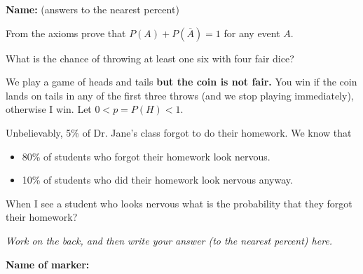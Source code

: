 \documentclass[9pt]{exam}
\begin{document}
\vspace{-4mm}

\textbf{Name:} \dotfill \hspace{3cm} (answers to the nearest percent)

\begin{questions} 
\question[3] From the axioms prove that $P(A) + P(\overline{A}) = 1$ for any event $A$.
\fillwithdottedlines{23mm}

\question[2] What is the chance of throwing at least one six with four fair dice?
\fillwithdottedlines{14mm}

\question We play a game of heads and tails \textbf{but the coin is not fair.} You win if the coin lands on tails in any of the first three throws (and we stop playing immediately), otherwise I win. Let $0 < p = P(H) < 1$.

\question[4] Unbelievably, 5\% of Dr. Jane's class forgot to do their homework. We know that
\begin{itemize}
\item 80\% of students who forgot their homework look nervous.
\item 10\% of students who did their homework look nervous anyway. 
\end{itemize}
When I see a student who looks nervous what is the probability that they forgot their homework?

\vspace{2mm}
\emph{Work on the back, and then write your answer (to the nearest percent) here.} \dotfill

\end{questions}


\begin{tcolorbox}

\textbf{Name of marker:} 

\begin{center}
\gradetable[h][questions]
\end{center}

\end{tcolorbox}
\end{document}
